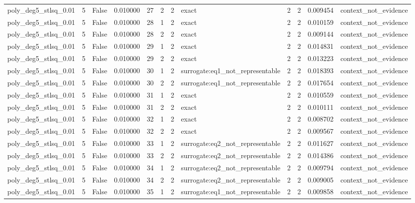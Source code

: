 \begin{tabular}{lrrrrrrlrrrl}
poly\_deg5\_stlsq\_0.01 & 5 & False & 0.010000 & 27 & 2 & 2 & exact & 2 & 2 & 0.009454 & context\_not\_evidence \\
poly\_deg5\_stlsq\_0.01 & 5 & False & 0.010000 & 28 & 1 & 2 & exact & 2 & 2 & 0.010159 & context\_not\_evidence \\
poly\_deg5\_stlsq\_0.01 & 5 & False & 0.010000 & 28 & 2 & 2 & exact & 2 & 2 & 0.009144 & context\_not\_evidence \\
poly\_deg5\_stlsq\_0.01 & 5 & False & 0.010000 & 29 & 1 & 2 & exact & 2 & 2 & 0.014831 & context\_not\_evidence \\
poly\_deg5\_stlsq\_0.01 & 5 & False & 0.010000 & 29 & 2 & 2 & exact & 2 & 2 & 0.013223 & context\_not\_evidence \\
poly\_deg5\_stlsq\_0.01 & 5 & False & 0.010000 & 30 & 1 & 2 & surrogate:eq1\_not\_representable & 2 & 2 & 0.018393 & context\_not\_evidence \\
poly\_deg5\_stlsq\_0.01 & 5 & False & 0.010000 & 30 & 2 & 2 & surrogate:eq1\_not\_representable & 2 & 2 & 0.017654 & context\_not\_evidence \\
poly\_deg5\_stlsq\_0.01 & 5 & False & 0.010000 & 31 & 1 & 2 & exact & 2 & 2 & 0.010559 & context\_not\_evidence \\
poly\_deg5\_stlsq\_0.01 & 5 & False & 0.010000 & 31 & 2 & 2 & exact & 2 & 2 & 0.010111 & context\_not\_evidence \\
poly\_deg5\_stlsq\_0.01 & 5 & False & 0.010000 & 32 & 1 & 2 & exact & 2 & 2 & 0.008702 & context\_not\_evidence \\
poly\_deg5\_stlsq\_0.01 & 5 & False & 0.010000 & 32 & 2 & 2 & exact & 2 & 2 & 0.009567 & context\_not\_evidence \\
poly\_deg5\_stlsq\_0.01 & 5 & False & 0.010000 & 33 & 1 & 2 & surrogate:eq2\_not\_representable & 2 & 2 & 0.011627 & context\_not\_evidence \\
poly\_deg5\_stlsq\_0.01 & 5 & False & 0.010000 & 33 & 2 & 2 & surrogate:eq2\_not\_representable & 2 & 2 & 0.014386 & context\_not\_evidence \\
poly\_deg5\_stlsq\_0.01 & 5 & False & 0.010000 & 34 & 1 & 2 & surrogate:eq2\_not\_representable & 2 & 2 & 0.009794 & context\_not\_evidence \\
poly\_deg5\_stlsq\_0.01 & 5 & False & 0.010000 & 34 & 2 & 2 & surrogate:eq2\_not\_representable & 2 & 2 & 0.009005 & context\_not\_evidence \\
poly\_deg5\_stlsq\_0.01 & 5 & False & 0.010000 & 35 & 1 & 2 & surrogate:eq1\_not\_representable & 2 & 2 & 0.009858 & context\_not\_evidence \\

\end{tabular}
